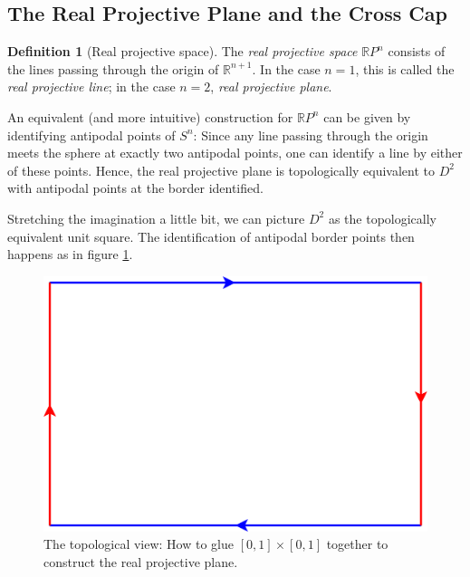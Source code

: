 \documentclass[11pt,            %
               a4paper,         %
               oneside,         %
               DIV12,           %
               fleqn,           %
               halfparskip,     %
               nochapterprefix, %
              ]{scrartcl} %
\theoremstyle{definition}
\newtheorem{definition}{Definition}
\begin{document}
\subsection{The Real Projective Plane and the Cross Cap}
\label{sec:rp2}

\begin{definition}[Real projective space]
  The \emph{real projective space} $\mathbb{R}P^n$ consists of the lines
  passing through the origin of $\mathbb{R}^{n+1}$. In the case $n=1$,
  this is called the \emph{real projective line}; in the case $n=2$,
  \emph{real projective plane}.
\end{definition}
%
\begin{minipage}{0.55\textwidth}
  An equivalent (and more intuitive) construction for $\mathbb{R}P^n$
  can be given by identifying antipodal points of $S^n$: Since any
  line passing through the origin meets the sphere at exactly two
  antipodal points, one can identify a line by either of these points.
  Hence, the real projective plane is topologically equivalent to
  $D^2$ with antipodal points at the border identified.

  Stretching the imagination a little bit, we can picture $D^2$ as the
  topologically equivalent unit square. The identification of
  antipodal border points then happens as in figure \ref{fig:rp2}.
\end{minipage}%
\hfill%
\begin{minipage}{0.35\textwidth}
  \begin{figure}[H]
    \centering
    \includegraphics[keepaspectratio=true,width=\textwidth]{../planar-graphs/crosscap-construction.pdf}
    \caption{The topological view: How to glue $[0,1]\times[0,1]$
      together to construct the real projective plane.}
    \label{fig:rp2}
  \end{figure}
\end{minipage}%
\end{document}
